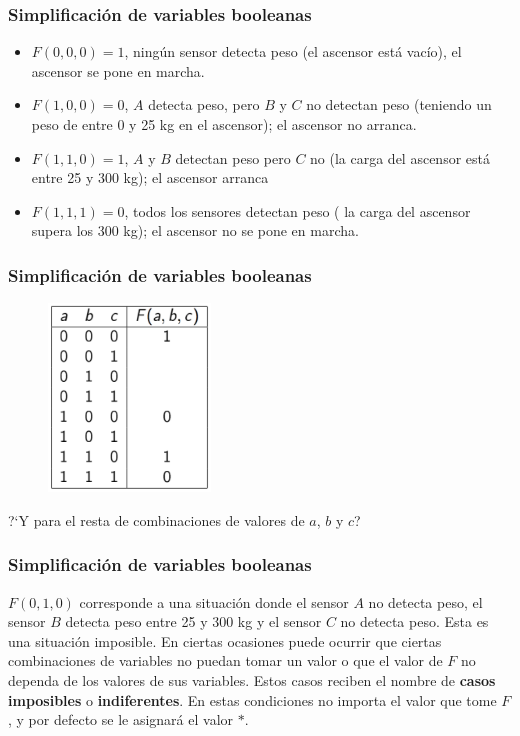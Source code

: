 \documentclass{beamer}
\begin{document}
\begin{frame}
\frametitle{Simplificaci\'on de variables booleanas}
\begin{itemize}
\item $F(0,0,0) = 1 $, ning\'un sensor detecta peso (el ascensor est\'a vac\'io), el ascensor se pone en marcha. 
\item $F(1,0,0) = 0 $, $A$ detecta peso, pero $B$ y $C$ no detectan peso (teniendo un peso de entre 0 y 25 kg en el ascensor); el ascensor no arranca.  
\item $F(1,1,0) = 1 $, $A$ y $B$ detectan peso pero $C$ no (la carga del ascensor est\'a entre 25 y 300 kg); el ascensor arranca
\item $F(1,1,1) = 0 $, todos los sensores detectan peso ( la carga del ascensor supera los 300 kg); el ascensor no se pone en marcha.
\end{itemize}

\end{frame}




\begin{frame}
\frametitle{Simplificaci\'on de variables booleanas}
 \begin{figure}[h]
  \label{fig:volumen}
\centering
\includegraphics[height=5cm]{k9}
\end{figure}
?`Y para el resta de combinaciones de valores de $a$, $b$ y $c$?
\end{frame}


\begin{frame}
\frametitle{Simplificaci\'on de variables booleanas}
$F(0,1,0)$ corresponde a una situaci\'on donde el sensor $A$ no detecta peso, el sensor $B$ detecta peso entre 25 y 300 kg y el sensor $C$ no detecta peso. Esta es una situaci\'on imposible.
En ciertas ocasiones puede ocurrir que ciertas combinaciones de variables no puedan tomar un valor o que el valor de $F$ no dependa de los valores de sus variables. Estos casos reciben el nombre de \textbf{casos imposibles} o \textbf{indiferentes}. En estas condiciones no importa el valor que tome $F$, y por defecto se le asignar\'a el valor $*$. 
\end{frame}
\end{document}
